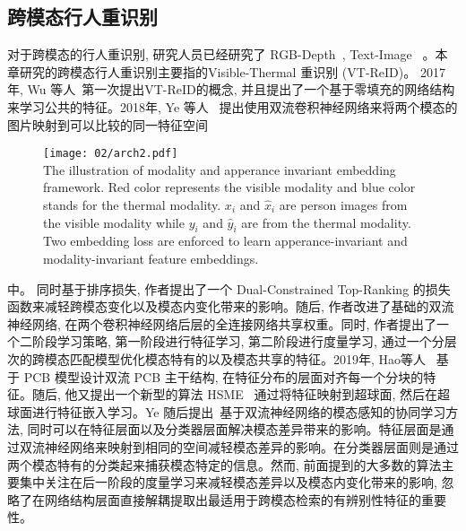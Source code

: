 \subsection{跨模态行人重识别}
对于跨模态的行人重识别, 研究人员已经研究了 RGB-Depth~\cite{haque2016recurrent, munaro20143d, wu2017robust},  Text-Image ~\cite{li2017identity,li2017person,ye2015specific, yin2017adversarial}。本章研究的跨模态行人重识别主要指的Visible-Thermal 重识别 (VT-ReID)。 2017年, Wu 等人~\cite{wu2017rgb}第一次提出VT-ReID的概念, 并且提出了一个基于零填充的网络结构来学习公共的特征。2018年, Ye 等人~\cite{ye2018visible} 提出使用双流卷积神经网络来将两个模态的图片映射到可以比较的同一特征空间
\begin{figure}[!htp]
    \centering
    \texttt{[image: 02/arch2.pdf]} \\
      {The illustration of modality and apperance invariant embedding framework. Red color represents the visible modality and blue color stands for the thermal modality. $x_i$ and $\hat{x}_i$ are person images from the visible modality while $y_i$ and $\hat{y}_i$ are from the thermal modality. Two embedding loss are enforced to learn  apperance-invariant and modality-invariant feature embeddings.}   
      \label{fig:arch2}
\end{figure} 
中。 同时基于排序损失, 作者提出了一个 Dual-Constrained Top-Ranking 的损失函数来减轻跨模态变化以及模态内变化带来的影响。随后, 作者改进了基础的双流神经网络, 在两个卷积神经网络后层的全连接网络共享权重。同时, 作者提出了一个二阶段学习策略, 第一阶段进行特征学习, 第二阶段进行度量学习, 通过一个分层次的跨模态匹配模型优化模态特有的以及模态共享的特征。2019年, Hao等人~\cite{hao2019dual} 基于 PCB 模型设计双流 PCB 主干结构, 在特征分布的层面对齐每一个分块的特征。随后, 他又提出一个新型的算法 HSME~\cite{hao2019hsme} 通过将特征映射到超球面, 然后在超球面进行特征嵌入学习。Ye 随后提出~\cite{ye2019modality}基于双流神经网络的模态感知的协同学习方法, 同时可以在特征层面以及分类器层面解决模态差异带来的影响。特征层面是通过双流神经网络来映射到相同的空间减轻模态差异的影响。在分类器层面则是通过两个模态特有的分类起来捕获模态特定的信息。然而, 前面提到的大多数的算法主要集中关注在后一阶段的度量学习来减轻模态差异以及模态内变化带来的影响, 忽略了在网络结构层面直接解耦提取出最适用于跨模态检索的有辨别性特征的重要性。

